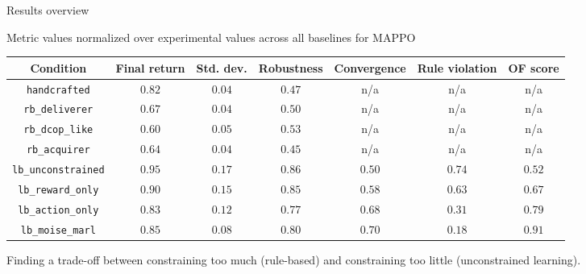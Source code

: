 \documentclass[aspectratio=169]{beamer}
\begin{document}
\begin{frame}{Results overview}

  \scriptsize
  \vfill
  \begin{center}
    \setlength{\tabcolsep}{5pt}
    \renewcommand{\arraystretch}{1.03}
    Metric values normalized over experimental values across all baselines for MAPPO\citep{yu2021mappo}
    \begin{tabularx}{0.99\linewidth}{c c c c c c c}
      \toprule
      Condition                  & Final return    & Std. dev.       & Robustness      & Convergence     & Rule violation  & OF score        \\
      \midrule
      \texttt{handcrafted}       & $0.82$          & $0.04$          & $0.47$          & n/a             & n/a             & n/a             \\
      \texttt{rb\_deliverer}     & $0.67$          & $0.04$          & $0.50$          & n/a             & n/a             & n/a             \\
      \texttt{rb\_dcop\_like}    & $0.60$          & $0.05$          & $0.53$          & n/a             & n/a             & n/a             \\
      \texttt{rb\_acquirer}      & $0.64$          & $0.04$          & $0.45$          & n/a             & n/a             & n/a             \\
      \texttt{lb\_unconstrained} & $\mathbf{0.95}$ & $0.17$          & $\mathbf{0.86}$ & $0.50$          & $0.74$          & $0.52$          \\
      \texttt{lb\_reward\_only}  & $0.90$          & $0.15$          & $0.85$          & $0.58$          & $0.63$          & $0.67$          \\
      \texttt{lb\_action\_only}  & $0.83$          & $0.12$          & $0.77$          & $0.68$          & $0.31$          & $0.79$          \\
      \texttt{lb\_moise\_marl}   & $0.85$          & $\mathbf{0.08}$ & $0.80$          & $\mathbf{0.70}$ & $\mathbf{0.18}$ & $\mathbf{0.91}$ \\
      \bottomrule
    \end{tabularx}

    \vspace{0.45cm}
    \small
    Finding a trade-off between constraining too much (rule-based) and constraining too little (unconstrained learning).
  \end{center}
  \vfill

\end{frame}
\end{document}
